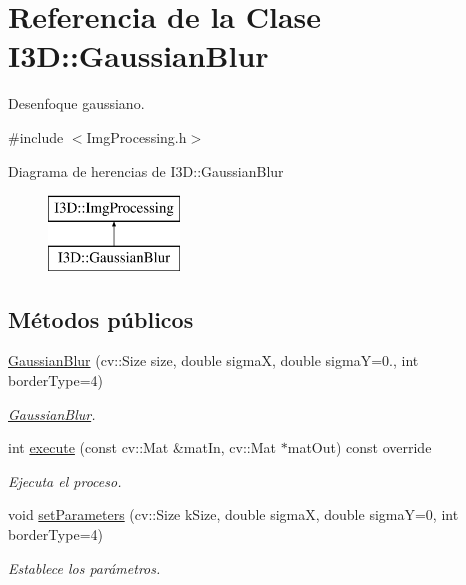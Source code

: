 \hypertarget{class_i3_d_1_1_gaussian_blur}{}\section{Referencia de la Clase I3D\+:\+:Gaussian\+Blur}
\label{class_i3_d_1_1_gaussian_blur}


Desenfoque gaussiano.  




{\ttfamily \#include $<$Img\+Processing.\+h$>$}

Diagrama de herencias de I3D\+:\+:Gaussian\+Blur\begin{figure}[H]
\begin{center}
\leavevmode
\includegraphics[height=2.000000cm]{class_i3_d_1_1_gaussian_blur}
\end{center}
\end{figure}
\subsection*{Métodos públicos}
\begin{DoxyCompactItemize}
\item 
\hyperlink{class_i3_d_1_1_gaussian_blur_ae83c05d57cb336bff56230338c33da38}{Gaussian\+Blur} (cv\+::\+Size size, double sigmaX, double sigmaY=0., int border\+Type=4)
\begin{DoxyCompactList}\small\item\em \hyperlink{class_i3_d_1_1_gaussian_blur}{Gaussian\+Blur}. \end{DoxyCompactList}\item 
int \hyperlink{class_i3_d_1_1_gaussian_blur_a19812cea51167dd35e8a85d3178061d5}{execute} (const cv\+::\+Mat \&mat\+In, cv\+::\+Mat $\ast$mat\+Out) const  override
\begin{DoxyCompactList}\small\item\em Ejecuta el proceso. \end{DoxyCompactList}\item 
void \hyperlink{class_i3_d_1_1_gaussian_blur_a8d22c6f666e7939aaeaecf3a752f464a}{set\+Parameters} (cv\+::\+Size k\+Size, double sigmaX, double sigmaY=0, int border\+Type=4)
\begin{DoxyCompactList}\small\item\em Establece los parámetros. \end{DoxyCompactList}\end{DoxyCompactItemize}
